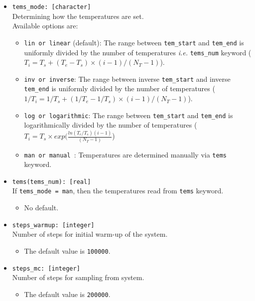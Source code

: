 \documentclass[10pt]{report}
\begin{document}
\begin{itemize}
\begin{itemize} [label=\adfhalfrightarrowhead]
\item  The default value is {\tt 5.0}K.
\end{itemize}
\item {\tt tems\_mode: [character]}  \\
Determining how the temperatures are set. \\
Available options are:
\begin{itemize} [label=\adfhalfrightarrowhead]
\item {\tt lin or linear} (default):
 The range between {\tt tem\_start} and {\tt tem\_end}
 is uniformly divided by the number of temperatures {\it i.e.} {\tt tems\_num} keyword ($T_i=T_s+(T_e-T_s)\times(i-1)/(N_T-1)$).
\item {\tt inv  or inverse}:  
 The range between inverse {\tt tem\_start} and inverse {\tt tem\_end}
 is uniformly divided by the number of temperatures ($1/T_i=1/T_s+(1/T_e-1/T_s)\times(i-1)/(N_T-1)$).
\item {\tt log  or logarithmic}:  
 The range between {\tt tem\_start} and {\tt tem\_end}
 is  logarithmically divided by the number of temperatures ($T_i = T_s\times exp(\frac{ln(T_e/T_s)(i-1)}{(N_T-1)}$)
\item {\tt man  or manual }: Temperatures are determined manually via {\tt tems} keyword.
\end{itemize}
\item {\tt tems(tems\_num): [real]}             \\
If {\tt tems\_mode = man}, then the temperatures read from {\tt tems} keyword.
\begin{itemize} [label=\adfhalfrightarrowhead]
\item  No default.
\end{itemize}
\item {\tt steps\_warmup: [integer]}                  \\
Number of steps for initial warm-up of the system.
\begin{itemize} [label=\adfhalfrightarrowhead]
\item  The default value is {\tt 100000}.
\end{itemize}
\item {\tt steps\_mc: [integer]}                      \\
Number of steps for sampling from system.
\begin{itemize} [label=\adfhalfrightarrowhead]
\item  The default value is {\tt 200000}.
\end{itemize}

\end{itemize}
\end{document}

